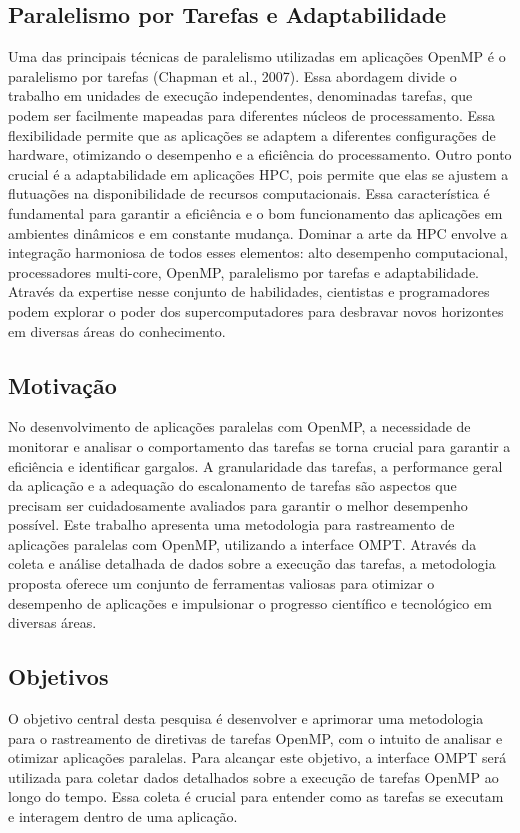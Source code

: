 \documentclass[ppgc,diss]{iiufrgs}
\begin{document}
\subsection{Paralelismo por Tarefas e Adaptabilidade}
Uma das principais técnicas de paralelismo utilizadas em aplicações OpenMP é o paralelismo por tarefas (Chapman et al., 2007). Essa abordagem divide o trabalho em unidades de execução independentes, denominadas tarefas, que podem ser facilmente mapeadas para diferentes núcleos de processamento. Essa flexibilidade permite que as aplicações se adaptem a diferentes configurações de hardware, otimizando o desempenho e a eficiência do processamento.
Outro ponto crucial é a adaptabilidade em aplicações HPC, pois permite que elas se ajustem a flutuações na disponibilidade de recursos computacionais. Essa característica é fundamental para garantir a eficiência e o bom funcionamento das aplicações em ambientes dinâmicos e em constante mudança.
Dominar a arte da HPC envolve a integração harmoniosa de todos esses elementos: alto desempenho computacional, processadores multi-core, OpenMP, paralelismo por tarefas e adaptabilidade. Através da expertise nesse conjunto de habilidades, cientistas e programadores podem explorar o poder dos supercomputadores para desbravar novos horizontes em diversas áreas do conhecimento.

\subsection{Motivação}
No desenvolvimento de aplicações paralelas com OpenMP, a necessidade de monitorar e analisar o comportamento das tarefas se torna crucial para garantir a eficiência e identificar gargalos. A granularidade das tarefas, a performance geral da aplicação e a adequação do escalonamento de tarefas são aspectos que precisam ser cuidadosamente avaliados para garantir o melhor desempenho possível.
Este trabalho apresenta uma metodologia para rastreamento de aplicações paralelas com OpenMP, utilizando a interface OMPT. Através da coleta e análise detalhada de dados sobre a execução das tarefas, a metodologia proposta oferece um conjunto de ferramentas valiosas para otimizar o desempenho de aplicações e impulsionar o progresso científico e tecnológico em diversas áreas.

\subsection{Objetivos}
O objetivo central desta pesquisa é desenvolver e aprimorar uma metodologia para o rastreamento de diretivas de tarefas OpenMP, com o intuito de analisar e otimizar aplicações paralelas. Para alcançar este objetivo, a interface OMPT será utilizada para coletar dados detalhados sobre a execução de tarefas OpenMP ao longo do tempo. Essa coleta é crucial para entender como as tarefas se executam e interagem dentro de uma aplicação.
\end{document}
